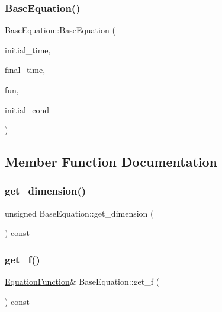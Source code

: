 \subsubsection{\texorpdfstring{Base\+Equation()}{BaseEquation()}}
{\footnotesize\ttfamily Base\+Equation\+::\+Base\+Equation (\begin{DoxyParamCaption}\item[{const double \&}]{initial\+\_\+time,  }\item[{const double \&}]{final\+\_\+time,  }\item[{\hyperlink{structEquationFunction}{Equation\+Function} \&}]{fun,  }\item[{const \hyperlink{utils_8hpp_a8e0cccfe9e5cee5140bfcfbd9a3a6a0e}{Rnvector} \&}]{initial\+\_\+cond }\end{DoxyParamCaption})\hspace{0.3cm}{\ttfamily [inline]}}



\subsection{Member Function Documentation}
\mbox{\label{classBaseEquation_a904f532d60a0a3bfab3e317cfc35c171}} 
\subsubsection{\texorpdfstring{get\+\_\+dimension()}{get\_dimension()}}
{\footnotesize\ttfamily unsigned Base\+Equation\+::get\+\_\+dimension (\begin{DoxyParamCaption}{ }\end{DoxyParamCaption}) const\hspace{0.3cm}{\ttfamily [inline]}}

\mbox{\label{classBaseEquation_ad5575137eeccd996ad27ed20ef3d7f69}} 
\subsubsection{\texorpdfstring{get\+\_\+f()}{get\_f()}}
{\footnotesize\ttfamily \hyperlink{structEquationFunction}{Equation\+Function}\& Base\+Equation\+::get\+\_\+f (\begin{DoxyParamCaption}{ }\end{DoxyParamCaption}) const\hspace{0.3cm}{\ttfamily [inline]}}

